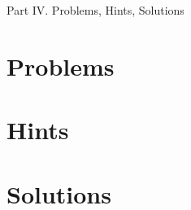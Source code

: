 \documentclass[oneside]{book}
\numberwithin{equation}{section}
\begin{document}
\begin{center}
	\huge Part IV. Problems, Hints, Solutions
\end{center}

\section*{Problems}

\section*{Hints}

\section*{Solutions}




\printbibliography[heading=bibintoc]
	
\end{document}
